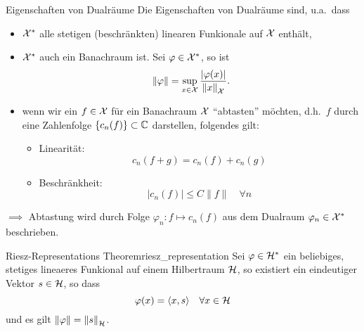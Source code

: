 \begin{recipe}{Eigenschaften von Dualräume}
Die Eigenschaften von Dualräume sind, u.a.\ dass
  \begin{itemize}
    \item $\mathcal{X}^{*}$ alle stetigen (beschränkten) linearen Funkionale auf $\mathcal{X}$ enthält,
    \item $\mathcal{X}^{*}$ auch ein Banachraum ist. Sei $\varphi \in \mathcal{X}^{*}$, so ist
    \begin{equation*}
      \|\varphi\| = \sup_{\substack{x\in\mathcal{X}}} \dfrac{|\varphi(x)|}{{\|x\|}_{\mathcal{X}}}.
    \end{equation*}
    \item wenn wir ein $f\in\mathcal{X}$ für ein Banachraum $\mathcal{X}$ ``abtasten'' möchten, d.h.\ $f$ durch eine Zahlenfolge ${\{c_n(f)\}} \subset \mathbb{C}$ darstellen, folgendes gilt:
    \begin{itemize}
      \item Linearität:
      \begin{equation*}
          c_n(f+g) = c_n(f) + c_n(g)
      \end{equation*}
      \item Beschränkheit:
      \begin{equation*}
        |c_n(f)| \leq C\|f\| \quad \forall n
      \end{equation*}
    \end{itemize}
  \end{itemize}
    $\implies$ Abtastung wird durch Folge $\varphi_n : f \mapsto c_n(f)$ aus dem Dualraum $\varphi_n \in \mathcal{X}^{*}$ beschrieben.
\end{recipe}

\begin{mytheo}{Riesz-Representations Theorem}{riesz_representation}
  Sei $\varphi \in {\mathcal{H}}^{*}$ ein beliebiges, stetiges lineaeres Funkional auf einem Hilbertraum $\mathcal{H}$, so existiert ein eindeutiger Vektor $s\in\mathcal{H}$, so dass
  \begin{equation*}
    \varphi(x) = \langle x, s\rangle \quad \forall x\in\mathcal{H}
  \end{equation*}
  und es gilt $\|\varphi\| = {\|s\|}_{\mathcal{H}}$.
\end{mytheo}
